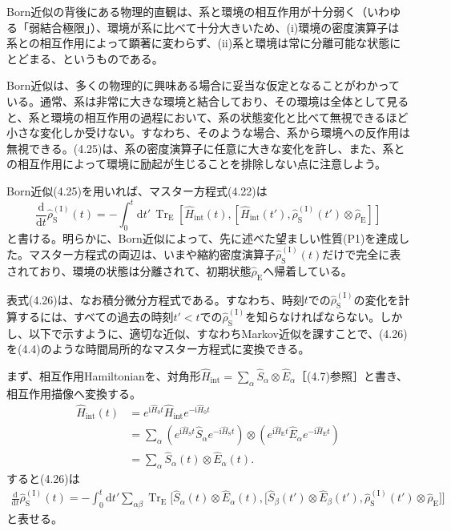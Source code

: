 Born近似の背後にある物理的直観は、系と環境の相互作用が十分弱く（いわゆる「弱結合極限」）、環境が系に比べて十分大きいため、(i)環境の密度演算子は系との相互作用によって顕著に変わらず、(ii)系と環境は常に分離可能な状態にとどまる、というものである。

\hypertarget{srcpage:161}{}\label{srcpage:161}
Born近似は、多くの物理的に興味ある場合に妥当な仮定となることがわかっている。通常、系は非常に大きな環境と結合しており、その環境は全体として見ると、系と環境の相互作用の過程において、系の状態変化と比べて無視できるほど小さな変化しか受けない。すなわち、そのような場合、系から環境への反作用は無視できる。(4.25)は、系の密度演算子に任意に大きな変化を許し、また、系との相互作用によって環境に励起が生じることを排除しない点に注意しよう。

Born近似(4.25)を用いれば、マスター方程式(4.22)は
\begin{equation}
\frac{\mathrm d}{\mathrm dt}\hat\rho^{(\mathrm I)}_{\mathrm S}(t)
=-\int_0^t\mathrm dt'\,\operatorname{Tr}_{\mathrm E}[\hat H_{\mathrm{int}}(t),[\hat H_{\mathrm{int}}(t'),\hat\rho^{(\mathrm I)}_{\mathrm S}(t')\otimes\hat\rho_{\mathrm E}]]
\tag{4.26}
\end{equation}
と書ける。明らかに、Born近似によって、先に述べた望ましい性質(P1)を達成した。マスター方程式の両辺は、いまや縮約密度演算子$\hat\rho^{(\mathrm I)}_{\mathrm S}(t)$だけで完全に表されており、環境の状態は分離されて、初期状態$\hat\rho_{\mathrm E}$へ帰着している。

表式(4.26)は、なお積分微分方程式である。すなわち、時刻$t$での$\hat\rho^{(\mathrm I)}_{\mathrm S}$の変化を計算するには、すべての過去の時刻$t'<t$での$\hat\rho^{(\mathrm I)}_{\mathrm S}$を知らなければならない。しかし、以下で示すように、適切な近似、すなわちMarkov近似を課すことで、(4.26)を(4.4)のような時間局所的なマスター方程式に変換できる。

まず、相互作用Hamiltonianを、対角形$\hat H_{\mathrm{int}}=\sum_\alpha\hat S_\alpha\otimes\hat E_\alpha$［(4.7)参照］と書き、相互作用描像へ変換する。
\begin{equation}
\begin{aligned}
\hat H_{\mathrm{int}}(t)
&=e^{\mathrm i\hat H_0t}\hat H_{\mathrm{int}}e^{-\mathrm i\hat H_0t}\\
&=\sum_\alpha(e^{\mathrm i\hat H_{\mathrm S}t}\hat S_\alpha e^{-\mathrm i\hat H_{\mathrm S}t})\otimes(e^{\mathrm i\hat H_{\mathrm E}t}\hat E_\alpha e^{-\mathrm i\hat H_{\mathrm E}t})\\
&=\sum_\alpha\hat S_\alpha(t)\otimes\hat E_\alpha(t).
\end{aligned}\tag{4.27}
\end{equation}
すると(4.26)は
\begin{equation}
\begin{aligned}
\frac{\mathrm d}{\mathrm dt}\hat\rho^{(\mathrm I)}_{\mathrm S}(t)
=-\int_0^t\mathrm dt'\sum_{\alpha\beta}\operatorname{Tr}_{\mathrm E}
\big[\hat S_\alpha(t)\otimes\hat E_\alpha(t),
\big[\hat S_\beta(t')\otimes\hat E_\beta(t'),\hat\rho^{(\mathrm I)}_{\mathrm S}(t')\otimes\hat\rho_{\mathrm E}\big]\big]
\end{aligned}\tag{4.28}
\end{equation}
と表せる。

